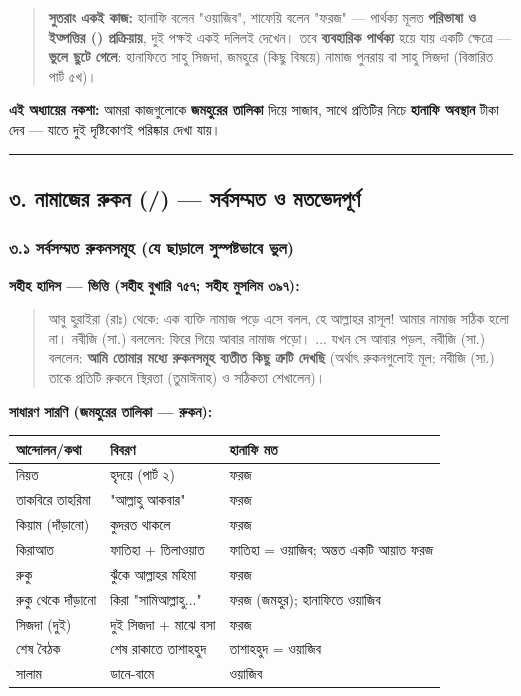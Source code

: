\begin{quote}
\textbf{সুতরাং একই কাজ:} হানাফি বলেন "ওয়াজিব", শাফেয়ি বলেন "ফরজ" — পার্থক্য মূলত \textbf{পরিভাষা ও ইত্পত্তির () প্রক্রিয়ায়}, দুই পক্ষই একই দলিলই দেখেন। তবে \textbf{ব্যবহারিক পার্থক্য} হয়ে যায় একটি ক্ষেত্রে — \textbf{ভুলে ছুটে গেলে}: হানাফিতে সাহু সিজদা, জমহুরে (কিছু বিষয়ে) নামাজ পুনরায় বা সাহু সিজদা (বিস্তারিত পার্ট ৫খ)।
\end{quote}

\textbf{এই অধ্যায়ের নকশা:} আমরা কাজগুলোকে \textbf{জমহুরের তালিকা} দিয়ে সাজাব, সাথে প্রতিটির নিচে \textbf{হানাফি অবস্থান} টীকা দেব — যাতে দুই দৃষ্টিকোণই পরিষ্কার দেখা যায়।

\medskip\hrule\medskip

\subsection*{৩. নামাজের রুকন (/) — সর্বসম্মত ও মতভেদপূর্ণ}

\subsubsection*{৩.১ সর্বসম্মত রুকনসমূহ (যে ছাড়ালে সুস্পষ্টভাবে ভুল)}

\textbf{সহীহ হাদিস — ভিত্তি (সহীহ বুখারি ৭৫৭; সহীহ মুসলিম ৩৯৭):}

\begin{quote}
আবু হুরাইরা (রাঃ) থেকে: এক ব্যক্তি নামাজ পড়ে এসে বলল, হে আল্লাহর রাসূল! আমার নামাজ সঠিক হলো না। নবীজি (সা.) বললেন: ফিরে গিয়ে আবার নামাজ পড়ো। ... যখন সে আবার পড়ল, নবীজি (সা.) বললেন: \textbf{আমি তোমার মধ্যে রুকনসমূহ ব্যতীত কিছু ত্রুটি দেখছি} (অর্থাৎ রুকনগুলোই মূল; নবীজি (সা.) তাকে প্রতিটি রুকনে স্থিরতা (তুমাঈনাহ) ও সঠিকতা শেখালেন)।
\end{quote}

\textbf{সাধারণ সারণি (জমহুরের তালিকা — রুকন):}

\begin{table}[h]\centering\small
\begin{tabular}{lll}
আন্দোলন/কথা & বিবরণ & হানাফি মত \\
\hline
নিয়ত & হৃদয়ে (পার্ট ২) & ফরজ \\
তাকবিরে তাহরিমা & "আল্লাহু আকবার" & ফরজ \\
কিয়াম (দাঁড়ানো) & কুদরত থাকলে & ফরজ \\
কিরাআত & ফাতিহা + তিলাওয়াত & ফাতিহা = ওয়াজিব; অন্তত একটি আয়াত ফরজ \\
রুকু & ঝুঁকে আল্লাহর মহিমা & ফরজ \\
রুকু থেকে দাঁড়ানো & কিরা "সামিআল্লাহু..." & ফরজ (জমহুর); হানাফিতে ওয়াজিব \\
সিজদা (দুই) & দুই সিজদা + মাঝে বসা & ফরজ \\
শেষ বৈঠক & শেষ রাকাতে তাশাহহুদ & তাশাহহুদ = ওয়াজিব \\
সালাম & ডানে-বামে & ওয়াজিব \\
\hline
\end{tabular}
\end{table}

